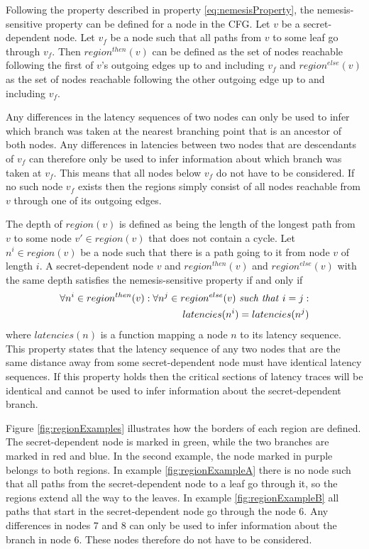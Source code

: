 Following the property described in property \ref{eq:nemesisProperty}, the nemesis-sensitive property can be defined for a node in the CFG. Let $v$ be a secret-dependent node. 
Let $v_f$ be a node such that all paths from $v$ to some leaf go through $v_f$. Then $region^{then}(v)$ can be defined as the set of nodes reachable following the 
first of $v$'s outgoing edges up to and including $v_f$ and $region^{else}(v)$ as the set of nodes reachable following the other outgoing edge up to and including $v_f$.

Any differences in the latency sequences of two nodes can only be used to infer which branch was taken at the nearest branching point that is an ancestor of both nodes. 
Any differences in latencies between two nodes that are descendants of $v_f$ can therefore only be used to infer information about which branch was taken at $v_f$. 
This means that all nodes below $v_f$ do not have to be considered. If no such node $v_f$ exists then the regions simply consist of all nodes reachable from $v$ through one of its outgoing edges. 

The depth of $region(v)$ is defined as being the length of the longest path from $v$ to some node $v' \in region(v)$ that does not contain a cycle.
Let $n^i \in region(v)$ be a node such that there is a path going to it from node $v$ of length $i$. 
A secret-dependent node $v$ and $region^{then}(v)$ and $region^{else}(v)$ with the same depth satisfies the nemesis-sensitive property if and only if 
\begin{equation} \label{eq:nemesisPropertyNode}
    \begin{split}
    \forall n^i \in region^{then}(v) : \forall n^j \in region^{else}(v) \text{ \textit{such that} } i=j :  \\ 
    latencies(n^i) = latencies(n^j)
    \end{split}
\end{equation}
where $latencies(n)$ is a function mapping a node $n$ to its latency sequence. This property states that the latency sequence of any two nodes that are the same distance away 
from some secret-dependent node must have identical latency sequences. If this property holds then the critical sections of latency traces will be identical and cannot be used to 
infer information about the secret-dependent branch. 

Figure \ref{fig:regionExamples} illustrates how the borders of each region are defined. The secret-dependent node is marked in green, while the two branches are marked in red and blue. In the second example, the node marked in purple belongs to both regions. In example \ref{fig:regionExampleA} there is no node such that all paths from the secret-dependent node to a leaf go through it, so the regions extend all the way to the leaves. In example \ref{fig:regionExampleB} all paths that start in the secret-dependent node go through the node 6. Any differences in nodes 7 and 8 can only be used to infer information about the branch in node 6. These nodes therefore do not have to be considered.  

